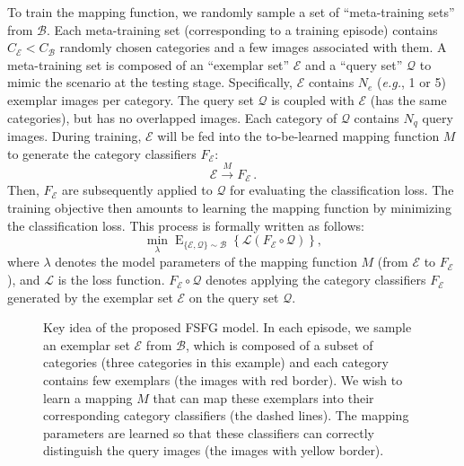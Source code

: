 \documentclass[10pt,twocolumn,letterpaper]{article}
\begin{document}
To train the mapping function, we randomly sample a set of ``meta-training sets'' from $\mathcal{B}$. Each meta-training set (corresponding to a training episode) contains $C_{\mathcal{E}}<C_{\mathcal{B}}$ randomly chosen categories and a few images associated with them. A meta-training set is composed of an ``{exemplar set}'' $\mathcal{E}$ and a ``{query set}'' $\mathcal{Q}$ to mimic the scenario at the testing stage. Specifically, $\mathcal{E}$ contains $N_e$ (\emph{e.g.}, 1 or 5) exemplar images per category. The query set $\mathcal{Q}$ is coupled with $\mathcal{E}$ (has the same categories), but has no overlapped images. Each category of $\mathcal{Q}$ contains $N_q$ query images. During training, $\mathcal{E}$ will be fed into the to-be-learned mapping function $M$ to generate the category classifiers $F_{\mathcal{E}}$:
\begin{equation}\label{eq:mapping}
 \mathcal{E} \xrightarrow{M} F_{\mathcal{E}} \,.
\end{equation}
Then, $F_{\mathcal{E}}$ are subsequently applied to $\mathcal{Q}$ for evaluating the classification loss. The training objective then amounts to learning the mapping function by minimizing the classification loss. This process is formally written as follows:
\begin{equation}\label{eq:mapping}
 \min_{\lambda} \mathop{E}_{\{\mathcal{E},\mathcal{Q}\} \sim \mathcal{B}} \left\{ \mathcal{L}\left( F_{\mathcal{E}}\circ \mathcal{Q}\right) \right\},
\end{equation}where $\lambda$ denotes the model parameters of the mapping function $M$ (from $\mathcal{E}$ to $F_{\mathcal{E}}$), and $\mathcal{L}$ is the loss function.  $F_{\mathcal{E}}\circ \mathcal{Q}$ denotes applying the category classifiers $F_{\mathcal{E}}$ generated by the exemplar set $\mathcal{E}$ on the query set $\mathcal{Q}$.
 


\begin{figure}[t!]
\caption{Key idea of the proposed FSFG model. In each episode, we sample an exemplar set $\mathcal{E}$ from $\mathcal{B}$, which is composed of a subset of categories (three categories in this example) and each category contains few exemplars (the images with red border). We wish to learn a mapping $M$ that can map these exemplars into their corresponding category classifiers (the dashed lines). The mapping parameters are learned so that these classifiers can correctly distinguish the query images (the images with yellow border).}
\label{fig:mapping}
\end{figure}
\end{document}
